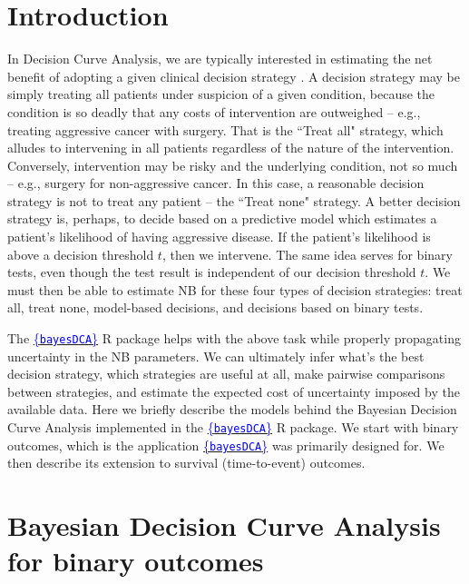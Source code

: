 \documentclass{article}
\def\bayesDCA{\href{https://giulianonetto.github.io/bayesdca/}{\textcolor{blue}{\{\texttt{bayesDCA}\}}} }
\begin{document}

\section*{Introduction}

In Decision Curve Analysis, we are typically interested in estimating the net benefit of adopting a given clinical decision strategy \cite{Vickers_2006}.
A decision strategy may be simply treating all patients under suspicion of a given condition, because the condition is
so deadly that any costs of intervention are outweighed -- e.g., treating aggressive cancer with surgery.
That is the ``Treat all" strategy, which alludes to intervening in all patients regardless of the nature of the intervention. Conversely, intervention may be risky and the underlying condition, 
not so much -- e.g., surgery for non-aggressive cancer.
In this case, a reasonable decision strategy is not to treat any patient -- the ``Treat none" strategy. A better decision strategy is, perhaps, 
to decide based on a predictive model which estimates a patient's likelihood of having aggressive disease. If the patient's likelihood
is above a decision threshold $t$, then we intervene. The same idea serves for binary tests, even though the test result is independent 
of our decision threshold $t$. We must then be able to estimate NB for these four types of decision strategies: treat all, treat none, model-based 
decisions, and decisions based on binary tests. 

The \bayesDCA R package helps with the above task while properly propagating uncertainty in the NB parameters. 
We can ultimately infer what's the best decision strategy, which strategies are useful at all, make pairwise comparisons between strategies, and 
estimate the expected cost of uncertainty imposed by the available data.
Here we briefly describe the models behind the Bayesian Decision Curve Analysis implemented in the 
\bayesDCA R package. We start with binary outcomes, which is the 
application \bayesDCA was primarily designed for. We then describe its extension to survival (time-to-event)
outcomes.

\section{Bayesian Decision Curve Analysis for binary outcomes}
\end{document}
